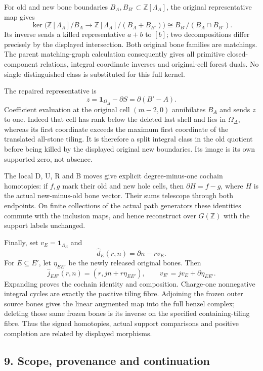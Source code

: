 \documentclass[
  10pt,
]{article}
\begin{document}
For old and new bone boundaries
\(B_A,B_{B'}\subset\mathbb Z[\Lambda_A]\), the original representative
map gives \[
\ker\bigl(\mathbb Z[\Lambda_A]/B_A\to\mathbb Z[\Lambda_A]/(B_A+B_{B'})\bigr)
\cong B_{B'}/(B_A\cap B_{B'}).
\] Its inverse sends a killed representative \(a+b\) to \([b]\); two
decompositions differ precisely by the displayed intersection. Both
original bone families are matchings. The parent matching-graph
calculation consequently gives all primitive closed-component relations,
integral coordinate inverses and original-cell forest duals. No single
distinguished class is substituted for this full kernel.

The repaired representative is \[
z=\mathbf1_{\Omega_\Delta}-\partial S=\partial(B'-A).
\] Coefficient evaluation at the original cell \((m-2,0)\) annihilates
\(B_A\) and sends \(z\) to one. Indeed that cell has rank below the
deleted last shell and lies in \(\Omega_\Delta\), whereas its first
coordinate exceeds the maximum first coordinate of the translated
all-stone tiling. It is therefore a split integral class in the old
quotient before being killed by the displayed original new boundaries.
Its image is its own supported zero, not absence.

The local D, U, R and B moves give explicit degree-minus-one cochain
homotopies: if \(f,g\) mark their old and new hole cells, then
\(\partial H=f-g\), where \(H\) is the actual new-minus-old bone vector.
Their sums telescope through both endpoints. On finite collections of
the actual path generators these identities commute with the inclusion
maps, and hence reconstruct over \(G(\mathbb Z)\) with the support
labels unchanged.

Finally, set \(v_E=\mathbf1_{\Lambda_E}\) and \[
\widehat d_E(r,n)=\partial n-rv_E.
\] For \(E\subseteq E'\), let \(\eta_{EE'}\) be the newly released
original bones. Then \[
\widehat j_{EE'}(r,n)=(r,jn+r\eta_{EE'}),\qquad
v_{E'}=jv_E+\partial\eta_{EE'}.
\] Expanding proves the cochain identity and composition. Charge-one
nonnegative integral cycles are exactly the positive tiling fibre.
Adjoining the frozen outer source bones gives the linear augmented map
into the full benzel complex; deleting those same frozen bones is its
inverse on the specified containing-tiling fibre. Thus the signed
homotopies, actual support comparisons and positive completion are
related by displayed morphisms.

\subsection{9. Scope, provenance and
continuation}\label{scope-provenance-and-continuation}
\end{document}
